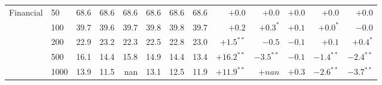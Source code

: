 \begin{tabular}{llrrrrrr|rrrrr}
Financial & 50 & 68.6 & 68.6 & 68.6 & 68.6 & 68.6 & 68.6 & $+0.0$ & $+0.0$ & $+0.0$ & $+0.0$ & $+0.0$ \\
 & 100 & 39.7 & 39.6 & 39.7 & 39.8 & 39.8 & 39.7 & $+0.2$ & $+0.3^{*}$ & $+0.1$ & $+0.0^{*}$ & $-0.0$ \\
 & 200 & 22.9 & 23.2 & 22.3 & 22.5 & 22.8 & 23.0 & $+1.5^{**}$ & $-0.5$ & $-0.1$ & $+0.1$ & $+0.4^{*}$ \\
 & 500 & 16.1 & 14.4 & 15.8 & 14.9 & 14.4 & 13.4 & $+16.2^{**}$ & $-3.5^{**}$ & $-0.1$ & $-1.4^{**}$ & $-2.4^{**}$ \\
 & 1000 & 13.9 & 11.5 & nan & 13.1 & 12.5 & 11.9 & $+11.9^{**}$ & $+nan$ & $+0.3$ & $-2.6^{**}$ & $-3.7^{**}$ \\
\bottomrule
\end{tabular}
